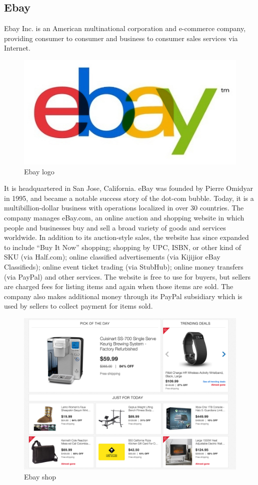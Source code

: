 \subsection{Ebay}
Ebay Inc. is an American multinational corporation and e-commerce company, providing consumer to consumer and business to consumer sales services via Internet.
\begin{figure}[htb]
  \centering
  \includegraphics[width=0.4\linewidth]{images/chapter1/ebay_logo.jpeg}\hfill
  \caption[Ebay logo]{Ebay logo}
  \label{fig:ebay_logo}
\end{figure}
It is headquartered in San Jose, California. eBay was founded by Pierre Omidyar in 1995, and became a notable success story of the dot-com bubble. Today, it is a multibillion-dollar business with operations localized in over 30 countries. The company manages eBay.com, an online auction and shopping website in which people and businesses buy and sell a broad variety of goods and services worldwide. In addition to its auction-style sales, the website has since expanded to include “Buy It Now” shopping; shopping by UPC, ISBN, or other kind of SKU (via Half.com); online classified advertisements (via Kijijior eBay Classifieds); online event ticket trading (via StubHub); online money transfers (via PayPal) and other services.
\newline
The website is free to use for buyers, but sellers are charged fees for listing items and again when those items are sold. The company also makes additional money through its PayPal subsidiary which is used by sellers to collect payment for items sold.
\begin{figure}[htb]
 \centering
 \includegraphics[width=0.9\linewidth]{images/chapter1/ex-ebay.png}\hfill
 \caption[Ebay shop]{Ebay shop}
 \label{fig:e_commerce_ebay_shop}
\end{figure}